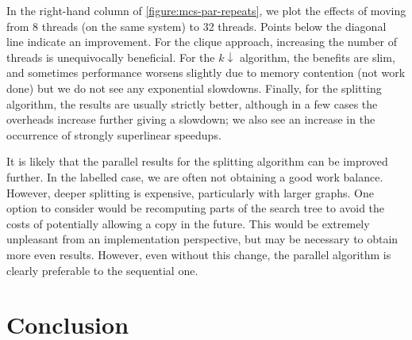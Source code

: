 \documentclass{llncs}
\begin{document}
In the right-hand column of \cref{figure:mcs-par-repeats}, we plot the effects of moving from 8
threads (on the same system) to 32 threads. Points below the diagonal line indicate an improvement.
For the clique approach, increasing the number of threads is unequivocally beneficial. For the
$k{\downarrow}$ algorithm, the benefits are slim, and sometimes performance worsens slightly due to
memory contention (not work done) but we do not see any exponential slowdowns. Finally, for the
splitting algorithm, the results are usually strictly better, although in a few cases the overheads
increase further giving a slowdown; we also see an increase in the occurrence of strongly
superlinear speedups.

It is likely that the parallel results for the splitting algorithm can be improved further. In the
labelled case, we are often not obtaining a good work balance. However, deeper splitting is
expensive, particularly with larger graphs. One option to consider would be recomputing parts of the
search tree to avoid the costs of potentially allowing a copy in the future. This would be extremely
unpleasant from an implementation perspective, but may be necessary to obtain more even results.
However, even without this change, the parallel algorithm is clearly preferable to the sequential
one.

\section{Conclusion}



\end{document}
